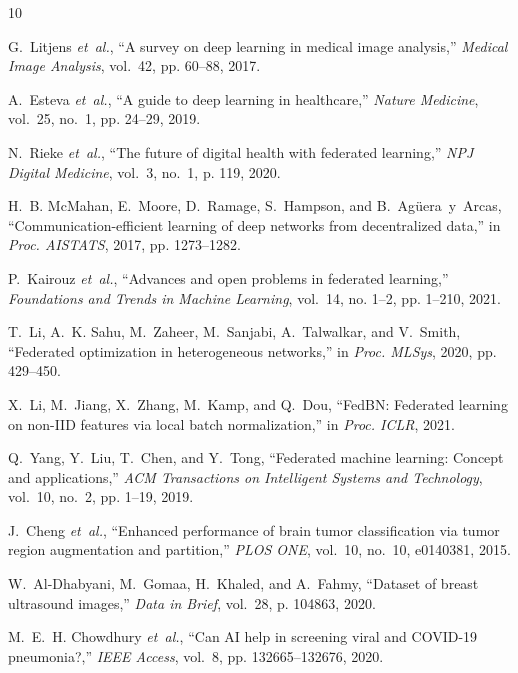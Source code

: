 \documentclass[journal]{IEEEtran}
\begin{document}

\begin{thebibliography}{10}
\fontsize{7.4pt}{8.4pt}\selectfont
\setlength{\itemsep}{-0.6pt plus 0.2pt}
\setlength{\parskip}{0pt}

G.~Litjens \textit{et~al.}, ``A survey on deep learning in medical image analysis,'' \textit{Medical Image Analysis}, vol.~42, pp. 60--88, 2017.

A.~Esteva \textit{et~al.}, ``A guide to deep learning in healthcare,'' \textit{Nature Medicine}, vol.~25, no.~1, pp. 24--29, 2019.

N.~Rieke \textit{et~al.}, ``The future of digital health with federated learning,'' \textit{NPJ Digital Medicine}, vol.~3, no.~1, p. 119, 2020.

H.~B. McMahan, E.~Moore, D.~Ramage, S.~Hampson, and B.~Ag{\"u}era~y~Arcas, ``Communication-efficient learning of deep networks from decentralized data,'' in \textit{Proc. AISTATS}, 2017, pp. 1273--1282.

P.~Kairouz \textit{et~al.}, ``Advances and open problems in federated learning,'' \textit{Foundations and Trends in Machine Learning}, vol.~14, no. 1--2, pp. 1--210, 2021.

T.~Li, A.~K. Sahu, M.~Zaheer, M.~Sanjabi, A.~Talwalkar, and V.~Smith, ``Federated optimization in heterogeneous networks,'' in \textit{Proc. MLSys}, 2020, pp. 429--450.

X.~Li, M.~Jiang, X.~Zhang, M.~Kamp, and Q.~Dou, ``FedBN: Federated learning on non-IID features via local batch normalization,'' in \textit{Proc. ICLR}, 2021.

Q.~Yang, Y.~Liu, T.~Chen, and Y.~Tong, ``Federated machine learning: Concept and applications,'' \textit{ACM Transactions on Intelligent Systems and Technology}, vol.~10, no.~2, pp. 1--19, 2019.

J.~Cheng \textit{et~al.}, ``Enhanced performance of brain tumor classification via tumor region augmentation and partition,'' \textit{PLOS ONE}, vol.~10, no.~10, e0140381, 2015.

W.~Al-Dhabyani, M.~Gomaa, H.~Khaled, and A.~Fahmy, ``Dataset of breast ultrasound images,'' \textit{Data in Brief}, vol.~28, p. 104863, 2020.

M.~E.~H. Chowdhury \textit{et~al.}, ``Can AI help in screening viral and COVID-19 pneumonia?,'' \textit{IEEE Access}, vol.~8, pp. 132665--132676, 2020.


\end{thebibliography}
\end{document}
